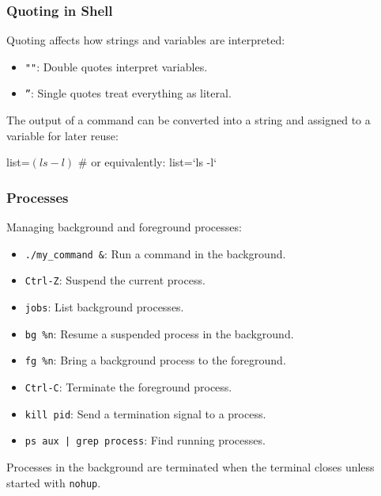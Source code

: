 \subsubsection{Quoting in Shell}

Quoting affects how strings and variables are interpreted:
\begin{itemize}
    \item \texttt{""}: Double quotes interpret variables.
    \item \texttt{''}: Single quotes treat everything as literal.
\end{itemize}


The output of a command can be converted into a string and assigned to a variable for later reuse: 

\begin{codeblock}[language=bash, numbers=none]
list=$(ls -l)$
# or equivalently:
list=`ls -l`
\end{codeblock}

\subsubsection{Processes}

Managing background and foreground processes:
\begin{itemize}
    \item \texttt{./my\_command \&}: Run a command in the background.
    \item \texttt{Ctrl-Z}: Suspend the current process.
    \item \texttt{jobs}: List background processes.
    \item \texttt{bg \%n}: Resume a suspended process in the background.
    \item \texttt{fg \%n}: Bring a background process to the foreground.
    \item \texttt{Ctrl-C}: Terminate the foreground process.
    \item \texttt{kill pid}: Send a termination signal to a process.
    \item \texttt{ps aux | grep process}: Find running processes.
\end{itemize}

Processes in the background are terminated when the terminal closes unless started with \texttt{nohup}.

